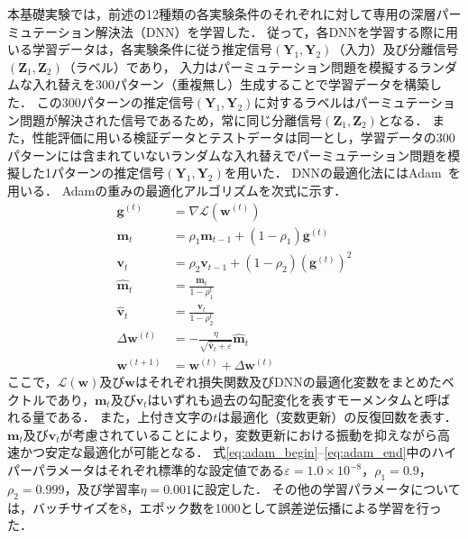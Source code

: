 本基礎実験では，前述の12種類の各実験条件のそれぞれに対して専用の深層パーミュテーション解決法（DNN）を学習した．
従って，各DNNを学習する際に用いる学習データは，各実験条件に従う推定信号$(\bm{Y}_1, \bm{Y}_2)$（入力）及び分離信号$(\bm{Z}_1, \bm{Z}_2)$（ラベル）であり，
入力はパーミュテーション問題を模擬するランダムな入れ替えを300パターン（重複無し）生成することで学習データを構築した．
この300パターンの推定信号$(\bm{Y}_1, \bm{Y}_2)$に対するラベルはパーミュテーション問題が解決された信号であるため，常に同じ分離信号$(\bm{Z}_1, \bm{Z}_2)$となる．
また，性能評価に用いる検証データとテストデータは同一とし，学習データの300パターンには含まれていないランダムな入れ替えでパーミュテーション問題を模擬した1パターンの推定信号$(\bm{Y}_1, \bm{Y}_2)$を用いた．
DNNの最適化法にはAdam~\cite{adam}を用いる．
Adamの重みの最適化アルゴリズムを次式に示す．
\begin{align}
  \mathbf{g}^{(t)} &=\nabla \mathcal{L}(\mathbf{w}^{(t)})\\
  \mathbf{m}_t &=\rho_1\mathbf{m}_{t-1}+(1-\rho_1)\mathbf{g}^{(t)}　\label{eq:adam_begin}　\\ 
  \mathbf{v}_t &=\rho_2\mathbf{v}_{t-1}+(1-\rho_2)(\mathbf{g}^{(t)})^2\\
  \hat{\mathbf{m}}_t &=\frac{\mathbf{m}_t}{1-\rho_1^t}\\
  \hat{\mathbf{v}}_t &=\frac{\mathbf{v}_t}{1-\rho_2^t}\\
  \Delta\mathbf{w}^{(t)} &=-\frac{\eta}{\sqrt{\hat{\mathbf{v}}_t+\varepsilon}}\hat{\mathbf{m}}_t\label{eq:adam_end}　\\ 
  \mathbf{w}^{(t+1)} &=\mathbf{w}^{(t)}+\Delta\mathbf{w}^{(t)}
\end{align}
ここで，$\mathcal{L}(\mathbf{w})$及び$\mathbf{w}$はそれぞれ損失関数及びDNNの最適化変数をまとめたベクトルであり，$\mathbf{m}_t$及び$\mathbf{v}_t$はいずれも過去の勾配変化を表すモーメンタムと呼ばれる量である．
また，上付き文字の$t$は最適化（変数更新）の反復回数を表す．
$\mathbf{m}_t$及び$\mathbf{v}_t$が考慮されていることにより，変数更新における振動を抑えながら高速かつ安定な最適化が可能となる．
式\eqref{eq:adam_begin}--\eqref{eq:adam_end}中のハイパーパラメータはそれぞれ標準的な設定値である$\varepsilon=1.0\times10^{-8}$，$\rho_1 = 0.9$，$\rho_2 = 0.999$，及び学習率$\eta=0.001$に設定した．
その他の学習パラメータについては，バッチサイズを8，エポック数を1000として誤差逆伝播による学習を行った．

